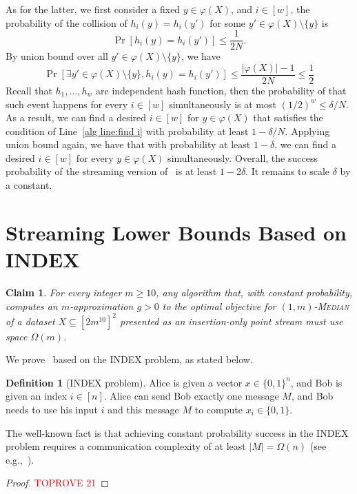 \documentclass[letterpaper,11pt]{article}
\theoremstyle{plain}
\newtheorem{claim}[theorem]{Claim}
\theoremstyle{definition}
\newtheorem{definition}[theorem]{Definition}
\theoremstyle{remark}
\renewcommand{\phi}{\varphi}
\newcommand{\ProblemName}[1]{\textsc{#1}}
\begin{document}
\begin{appendices}
As for the latter, we first consider a fixed $y\in \phi(X)$, and $i\in [w]$, the probability of the collision of $h_i(y)=h_i(y')$ for some $y'\in \phi(X)\setminus \{y\}$ is 
\begin{equation*}
    \Pr[h_i(y)=h_i(y')]\le \frac{1}{2N}.
\end{equation*}
By union bound over all $y'\in \phi(X)\setminus\{y\}$, we have 
\begin{equation*}
    \Pr[\exists y'\in \phi(X)\setminus\{y\}, h_i(y)=h_i(y')]\le \frac{|\phi(X)|-1}{2N}\le \frac{1}{2}
\end{equation*}
Recall that $h_1,\dots,h_w$ are independent hash function, then the probability of that such event happens for every $i\in[w]$ simultaneously is at most $(1/2)^w\le \delta/N$. As a result, we can find a desired $i\in[w]$ for $y\in \phi(X)$ that satisfies the condition of Line~\ref{alg line:find i} with probability at least $1-\delta/N$. Applying union bound again, we have that with probability at least $1-\delta$, we can find a desired $i\in[w]$ for every $y\in\phi(X)$ simultaneously. Overall, the success probability of the streaming version of~ is at least $1-2\delta$. It remains to scale $\delta$ by a constant. \section{Streaming Lower Bounds Based on INDEX}
\begin{claim}
    \label{claim:lb_m}
    For every integer $m\ge 10$, any algorithm that, with constant probability, computes an $m$-approximation $g>0$ to the optimal objective for \ProblemName{$(1,m)$-Median} of a dataset $X\subseteq [2m^{10}]^2$ presented as an insertion-only point stream must use space $\Omega(m)$.
\end{claim}

We prove~ based on the INDEX problem, as stated below.

\begin{definition}[INDEX problem]
    Alice is given a vector $x\in \{0,1\}^n$, and Bob is given an index $i\in[n]$. Alice can send Bob exactly one message $M$, and Bob needs to use his input $i$ and this message $M$ to compute $x_i\in \{0,1\}$.
\end{definition}
The well-known fact is that achieving constant probability success in the INDEX problem requires a communication complexity of at least $|M|=\Omega(n)$ (see e.g.,~\cite{DBLP:books/daglib/0011756, DBLP:journals/cc/KremerNR99, DBLP:journals/toc/JayramKS08}).

\begin{proof}\textcolor{red}{TOPROVE 21}\end{proof}
 \end{appendices}
\end{document}
